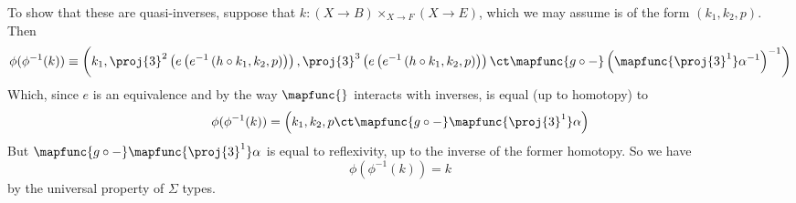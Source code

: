 To show that these are quasi-inverses, suppose that $k : (X \to B) \times_{X
\to F} (X \to E)$, which we may assume is of the form $(k_{1}, k_{2}, p)$.
Then
\[
  \phi(\phi^{-1}(k))
  \equiv
  \left(
    k_{1},
    \proj{3}^{2}\left(e\left(e^{-1}\left(h \circ k_{1}, k_{2},
    p\right)\right)\right),
  \proj{3}^{3}\left(e\left(e^{-1}\left(h \circ k_{1}, k_{2}, p\right)\right)\right) \ct \mapfunc{g \circ
  -}\left(\mapfunc{\proj{3}^{1}}\alpha^{-1}\right)^{-1}
  \right)
\]
Which, since $e$ is an equivalence and by the way $\mapfunc{}$ interacts with
inverses, is equal (up to homotopy) to
\[
  \phi(\phi^{-1}(k))
  =
  \left(
    k_{1},
    k_{2},
    p \ct \mapfunc{g \circ
  -}\mapfunc{\proj{3}^{1}}\alpha
  \right)
\]
But $\mapfunc{g \circ -}\mapfunc{\proj{3}^{1}}\alpha$ is equal to reflexivity,
up to the inverse of the former homotopy.  So we have
\[
  \phi(\phi^{-1}(k)) = k
\]
by the universal property of $\Sigma$ types.


